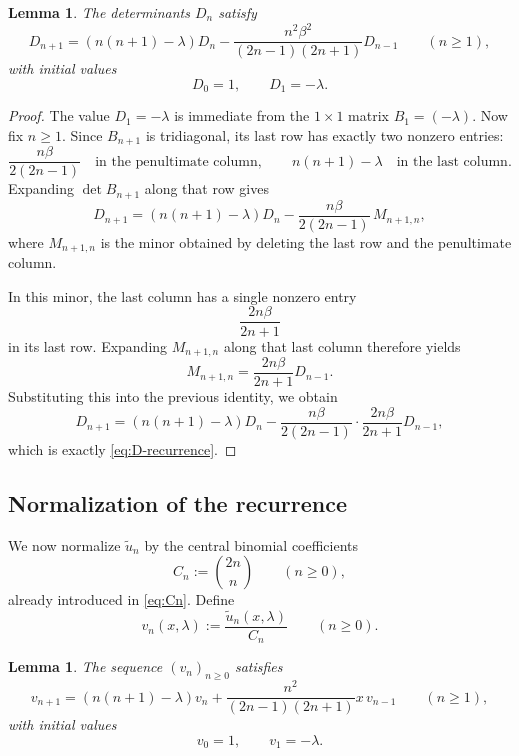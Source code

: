 \documentclass[11pt,letterpaper]{amsart}
\numberwithin{equation}{section}
\theoremstyle{plain}
\newtheorem{lemma}[theorem]{Lemma}
\theoremstyle{remark}
\begin{document}
\begin{lemma}\label{lem:D-recurrence}
The determinants $D_n$ satisfy
\begin{equation}\label{eq:D-recurrence}
 D_{n+1}=(n(n+1)-\lambda)D_n
 -\frac{n^2\beta^2}{(2n-1)(2n+1)}D_{n-1}
 \qquad(n\ge 1),
\end{equation}
with initial values
\begin{equation}\label{eq:D-initial}
 D_0=1,
 \qquad
 D_1=-\lambda.
\end{equation}
\end{lemma}

\begin{proof}
The value \(D_1=-\lambda\) is immediate from the \(1\times 1\) matrix \(B_1=(-\lambda)\).
Now fix \(n\ge 1\). Since \(B_{n+1}\) is tridiagonal, its last row has exactly two
nonzero entries:
\[
\frac{n\beta}{2(2n-1)}
\quad\text{in the penultimate column},
\qquad
n(n+1)-\lambda
\quad\text{in the last column}.
\]
Expanding \(\det B_{n+1}\) along that row gives
\[
D_{n+1}
=
(n(n+1)-\lambda)D_n
-
\frac{n\beta}{2(2n-1)}\,M_{n+1,n},
\]
where \(M_{n+1,n}\) is the minor obtained by deleting the last row and the
penultimate column.

In this minor, the last column has a single nonzero entry
\[
\frac{2n\beta}{2n+1}
\]
in its last row. Expanding \(M_{n+1,n}\) along that last column therefore yields
\[
M_{n+1,n}=\frac{2n\beta}{2n+1}D_{n-1}.
\]
Substituting this into the previous identity, we obtain
\[
D_{n+1}
=
(n(n+1)-\lambda)D_n
-
\frac{n\beta}{2(2n-1)}\cdot \frac{2n\beta}{2n+1}D_{n-1},
\]
which is exactly \eqref{eq:D-recurrence}.
\end{proof}

\subsection{Normalization of the recurrence}

We now normalize $\widetilde u_n$ by the central binomial coefficients
\[
 C_n:=\binom{2n}{n}
 \qquad(n\ge 0),
\]
already introduced in \eqref{eq:Cn}. Define
\begin{equation}\label{eq:vn-def}
 v_n(x,\lambda):=\frac{\widetilde u_n(x,\lambda)}{C_n}
 \qquad(n\ge 0).
\end{equation}

\begin{lemma}\label{lem:v-recurrence}
The sequence $(v_n)_{n\ge 0}$ satisfies
\begin{equation}\label{eq:v-recurrence}
 v_{n+1}=(n(n+1)-\lambda)v_n
 +\frac{n^2}{(2n-1)(2n+1)}x\,v_{n-1}
 \qquad(n\ge 1),
\end{equation}
with initial values
\begin{equation}\label{eq:v-initial}
 v_0=1,
 \qquad
 v_1=-\lambda.
\end{equation}
\end{lemma}
\end{document}

